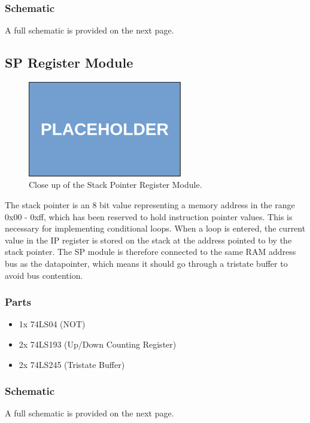 \subsubsection*{Schematic}
A full schematic is provided on the next page.



\subsection{SP Register Module}
\begin{figure}[H]
  \centering
  \includegraphics[width=0.6\textwidth]{img/placeholder}
  \caption{Close up of the Stack Pointer Register Module.}
  \label{fig:spregcloseup}
\end{figure}

The stack pointer is an 8 bit value representing a memory address in the range 0x00 - 0xff, which has been reserved to hold instruction pointer values. This is necessary for implementing conditional loops. When a loop is entered, the current value in the IP register is stored on the stack at the address pointed to by the stack pointer. The SP module is therefore connected to the same RAM address bus as the datapointer, which means it should go through a tristate buffer to avoid bus contention.

\subsubsection*{Parts}
\begin{itemize}\itemsep0em
\item 1x 74LS04 (NOT)
\item 2x 74LS193 (Up/Down Counting Register)
\item 2x 74LS245 (Tristate Buffer)
\end{itemize}

\subsubsection*{Schematic}
A full schematic is provided on the next page.



